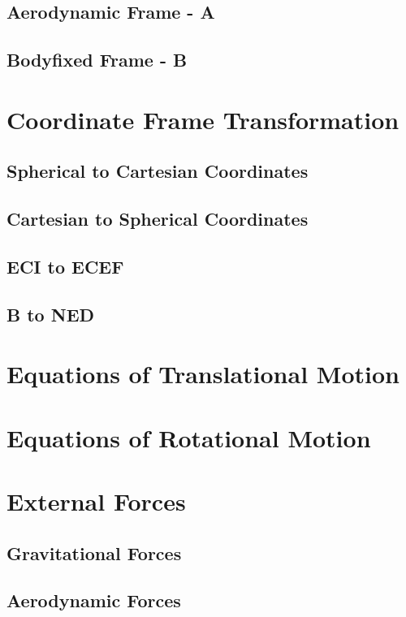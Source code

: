 \subsection{Aerodynamic Frame - A}
\subsection{Bodyfixed Frame - B}

\section{Coordinate Frame Transformation}
	\subsection{Spherical to Cartesian Coordinates}
	\subsection{Cartesian to Spherical Coordinates}
	\subsection{ECI to ECEF}
	\subsection{B to NED}
	
	
\section{Equations of Translational Motion}

\section{Equations of Rotational Motion}

\section{External Forces}
	\subsection{Gravitational Forces}
	\subsection{Aerodynamic Forces}

